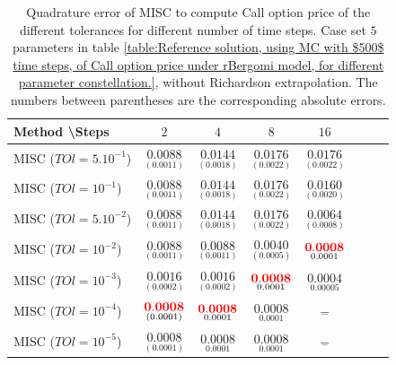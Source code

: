 \documentclass[11pt]{article}
\begin{document}
\begin{table}[h!]
	\centering
	\begin{tabular}{l*{6}{c}r}
		Method \textbackslash  Steps            & $2$ & $4$ & $8$ & $16$  \\
		\hline
		MISC ($TOl=5.10^{-1}$)  & $\underset{(   0.0011)}{\mathbf{  0.0088}}$ & $\underset{(
			0.0018)}{\mathbf{ 0.0144}}$ & $\underset{( 0.0022)}{\mathbf{0.0176}}$ & $\underset{(  0.0022)}{\mathbf{ 0.0176}}$  \\
		MISC ($TOl=10^{-1}$)  & $\underset{(   0.0011)}{\mathbf{  0.0088}}$ & $\underset{(
			0.0018)}{\mathbf{ 0.0144}}$& $\underset{( 0.0022)}{\mathbf{0.0176}}$  & $\underset{(  0.0020)}{\mathbf{ 0.0160}}$   \\
		MISC ($TOl=5.10^{-2}$)  &$\underset{(   0.0011)}{\mathbf{  0.0088}}$ & $\underset{(
			0.0018)}{\mathbf{ 0.0144}}$ & $\underset{( 0.0022)}{\mathbf{0.0176}}$  & $\underset{(0.0008)}{\mathbf{0.0064}}$  \\
		MISC ($TOl=10^{-2}$)  & $\underset{(   0.0011)}{\mathbf{  0.0088}}$ & $\underset{(0.0011
			)}{\mathbf{ 0.0088
		}}$ & $\underset{(0.0005)}{\mathbf{ 0.0040
		}}$ & $\underset{0.0001}{\mathbf{{\color{red}0.0008}}}$  \\
		MISC ($TOl=10^{-3}$)  & $\underset{( 0.0002)}{\mathbf{    0.0016}}$ & $\underset{(0.0002
			)}{\mathbf{ 0.0016
		}}$ & $\underset{0.0001}{\mathbf{{\color{red}0.0008}}}$ & $\underset{0.00005}{\mathbf{0.0004}}$ \\
		MISC ($TOl=10^{-4}$)  & $\underset{( 0.0001)}{\mathbf{    {\color{red}0.0008}}}$ & $\underset{0.0001}{\mathbf{{\color{red}0.0008}}}$& $\underset{0.0001}{\mathbf{0.0008}}$ & $\underset{-}{\mathbf{-}}$  \\
		
			MISC ($TOl=10^{-5}$)  & $\underset{( 0.0001)}{\mathbf{    0.0008}}$ & $\underset{0.0001}{\mathbf{0.0008}}$& $\underset{0.0001}{\mathbf{0.0008}}$ & $\underset{-}{\mathbf{-}}$  \\
		
		\hline
		
	\end{tabular}
	\caption{Quadrature error of MISC to compute Call option price of the different tolerances for different number of time steps. Case  set $5$ parameters in table \ref{table:Reference solution, using MC with $500$ time steps, of Call option price under rBergomi model, for different parameter constellation.}, without Richardson extrapolation. The numbers between parentheses are the corresponding absolute errors.}
	\label{Quadrature error of MISC to compute Call option price of the different tolerances for different number of time steps. Case  set $5$ parameters, without Richardson extrapolation. The numbers between parentheses are the corresponding absolute errors.}
\end{table}
\end{document}
